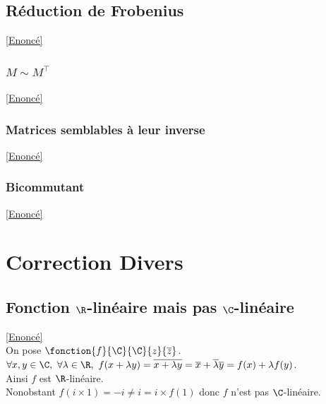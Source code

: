 \documentclass[8pt]{book}
\begin{document}
	\subsection{Réduction de Frobenius}
	\label{Réduction de Frobenius corrigé}
	\textcolor{blue}{\hyperref[Réduction de Frobenius]{[Enoncé]}}\\
	
	\subsubsection{$M\sim M^\top$}
	\label{M est semblable à sa transposée corrigé}
	\textcolor{blue}{\hyperref[M est semblable à sa transposée]{[Enoncé]}}\\
	
	\subsubsection{Matrices semblables à leur inverse}
	\label{Matrices semblables à leur inverse corrigé}
	\textcolor{blue}{\hyperref[Matrices semblables à leur inverse]{[Enoncé]}}\\
	
	\subsubsection{Bicommutant}
	\label{Bicommutant corrigé}
	\textcolor{blue}{\hyperref[Bicommutant]{[Enoncé]}}\\
	
	\newpage
\section{Correction Divers}

\subsection{Fonction $\R$-linéaire mais pas $\C$-linéaire }
\label{Fonction R linéaire mais pas C linéaire corrigé}
\textcolor{blue}{\hyperref[Fonction R linéaire mais pas C linéaire]{[Enoncé]}}\\
On pose $\fonction{f}{\C}{\C}{z}{\overline{z}}$.\\
$\forall x,y\in \C,\ \forall \lambda\in \R,\ f(x+\lambda y)=\overline{x+\lambda y}=\overline{x}+\overline{\lambda}\overline{y}=f(x)+\lambda f(y)$.\\
Ainsi $f$ est $\R$-linéaire.\\
Nonobstant $f(i\times 1)=-i\ne i=i\times f(1)$ donc $f$ n'est pas $\C$-linéaire.
\end{document}
